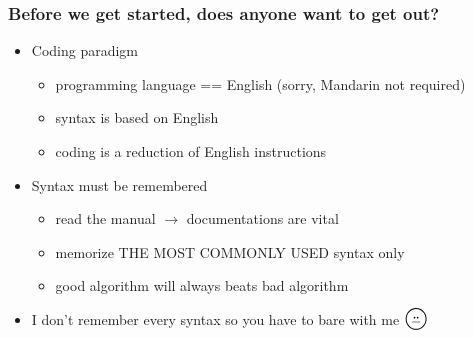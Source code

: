 \begin{frame}[fragile]
\frametitle{Before we get started, does anyone want to get out?}
\begin{itemize}
\item Coding paradigm
	\begin{itemize}
	\item programming language == English (sorry, Mandarin not required)
	\item syntax is based on English
	\item coding is a reduction of English instructions
	\end{itemize}

\item Syntax must be remembered
	\begin{itemize}
	\item read the manual $\longrightarrow$ documentations are vital
	\item memorize THE MOST COMMONLY USED syntax only
	\item good algorithm will always beats bad algorithm
	\end{itemize}		

\item I don't remember every syntax so you have to bare with me $\LARGE \pfbox$

\end{itemize}

\end{frame}